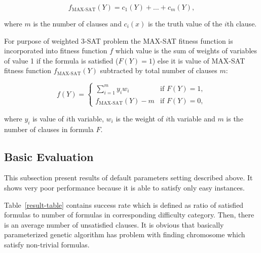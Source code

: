 \documentclass{article}
\begin{document}
$$f_{\text{MAX-SAT}}(Y) = c_1(Y) + \dots + c_m(Y),$$

where $m$ is the number of clauses and $c_i(x)$ is the truth value of the $i$th
clause.

For purpose of weighted 3-SAT problem the MAX-SAT fitness function is
incorporated into fitness function $f$
which value is the sum of weights of variables of value 1
if the formula is satisfied ($F(Y) = 1$)
else it is value of MAX-SAT fitness function $f_{\text{MAX-SAT}}(Y)$
subtracted by total number of clauses $m$:

$$
f(Y) = 
\begin{cases} 
    \sum_{i = 1}^m y_i w_i & \text{if } F(Y) = 1, \\
    f_{\text{MAX-SAT}}(Y) - m & \text{if } F(Y) = 0,
\end{cases}
$$

where $y_i$ is value of $i$th variable, $w_i$ is the weight of $i$th
variable and $m$ is the number of clauses in formula $F$.

\subsection{Basic Evaluation}
\label{sec:basic}

This subsection present results of default parameters setting described above.
It shows very poor performance
because it is able to satisfy only easy instances.

Table~\ref{result-table} contains success rate which is defined as ratio
of satisfied formulas to number of formulas
in corresponding difficulty category.
Then, there is an average number of unsatisfied clauses.  
It is obvious that basically parameterized genetic algorithm has problem
with finding chromosome which satisfy non-trivial formulas.
\end{document}
